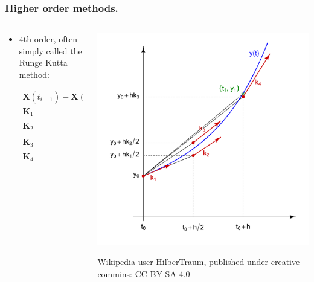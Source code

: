 \documentclass{beamer}
\begin{document}
\begin{frame}
\frametitle{Higher order methods.}
\begin{columns}
\begin{column}{0.5\linewidth}
\begin{itemize}
\item<1-> 4th order, often simply called the Runge Kutta method:

\begin{align*}
\mathbf{X}(t_{i+1})-\mathbf{X}(t_{i}) &= \frac{\Delta t}{6}(\mathbf{K}_1+2\mathbf{K}_2+2\mathbf{K}_3+\mathbf{K}_4 )\\
\mathbf{K}_1 &= \mathbf{f}_{ode}(\mathbf{X}(t_i),t_i)\\
\mathbf{K}_2 &= \mathbf{f}_{ode}(\mathbf{X}(t_i)+\frac{\Delta t}{2}\mathbf{K}_1,t_i+\frac{\Delta t}{2})\\
\mathbf{K}_3 &= \mathbf{f}_{ode}(\mathbf{X}(t_i)+\frac{\Delta t}{2}\mathbf{K}_2,t_i+\frac{\Delta t}{2})\\
\mathbf{K}_4 &= \mathbf{f}_{ode}(\mathbf{X}(t_i)+\Delta t\mathbf{K}_3,t_i+\Delta t).
\end{align*}

\end{itemize}
\end{column}
\begin{column}{0.5\linewidth}
\includegraphics[width=\linewidth]{Runge-Kutta_slopes.pdf}

{\color{gray} Wikipedia-user HilberTraum, published under creative commins: CC BY-SA 4.0}
\end{column}
\end{columns}
\end{frame}
\end{document}
